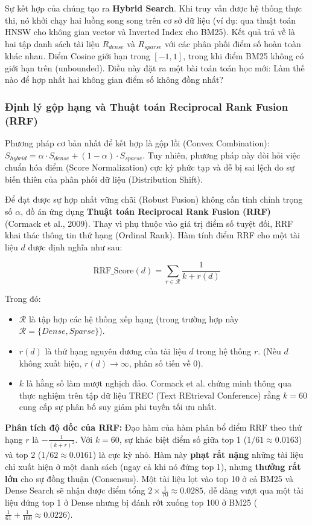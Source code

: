 Sự kết hợp của chúng tạo ra \textbf{Hybrid Search}. Khi truy vấn được hệ thống thực thi, nó khởi chạy hai luồng song song trên cơ sở dữ liệu (ví dụ: qua thuật toán HNSW cho không gian vector và Inverted Index cho BM25). Kết quả trả về là hai tập danh sách tài liệu $R_{dense}$ và $R_{sparse}$ với các phân phối điểm số hoàn toàn khác nhau. Điểm Cosine giới hạn trong $[-1, 1]$, trong khi điểm BM25 không có giới hạn trên (unbounded). Điều này đặt ra một bài toán toán học mới: Làm thế nào để hợp nhất hai không gian điểm số không đồng nhất?

\subsubsection{Định lý gộp hạng và Thuật toán Reciprocal Rank Fusion (RRF)}
Phương pháp cơ bản nhất để kết hợp là gộp lồi (Convex Combination): $S_{hybrid} = \alpha \cdot S_{dense} + (1 - \alpha) \cdot S_{sparse}$. Tuy nhiên, phương pháp này đòi hỏi việc chuẩn hóa điểm (Score Normalization) cực kỳ phức tạp và dễ bị sai lệch do sự biến thiên của phân phối dữ liệu (Distribution Shift).

Để đạt được sự hợp nhất vững chãi (Robust Fusion) không cần tinh chỉnh trọng số $\alpha$, đồ án ứng dụng \textbf{Thuật toán Reciprocal Rank Fusion (RRF)} (Cormack et al., 2009). Thay vì phụ thuộc vào giá trị điểm số tuyệt đối, RRF khai thác thông tin thứ hạng (Ordinal Rank). Hàm tính điểm RRF cho một tài liệu $d$ được định nghĩa như sau:

\begin{equation}
    \text{RRF\_Score}(d) = \sum_{r \in \mathcal{R}} \frac{1}{k + r(d)}
\end{equation}

Trong đó:
\begin{itemize}
    \item $\mathcal{R}$ là tập hợp các hệ thống xếp hạng (trong trường hợp này $\mathcal{R} = \{Dense, Sparse\}$).
    \item $r(d)$ là thứ hạng nguyên dương của tài liệu $d$ trong hệ thống $r$. (Nếu $d$ không xuất hiện, $r(d) \rightarrow \infty$, phân số tiến về 0).
    \item $k$ là hằng số làm mượt nghịch đảo. Cormack et al. chứng minh thông qua thực nghiệm trên tập dữ liệu TREC (Text REtrieval Conference) rằng $k=60$ cung cấp sự phân bố suy giảm phi tuyến tối ưu nhất.
\end{itemize}

\textbf{Phân tích độ dốc của RRF:} 
Đạo hàm của hàm phân bổ điểm RRF theo thứ hạng $r$ là $-\frac{1}{(k+r)^2}$. Với $k=60$, sự khác biệt điểm số giữa top 1 ($1/61 \approx 0.0163$) và top 2 ($1/62 \approx 0.0161$) là cực kỳ nhỏ. Hàm này \textbf{phạt rất nặng} những tài liệu chỉ xuất hiện ở một danh sách (ngay cả khi nó đứng top 1), nhưng \textbf{thưởng rất lớn} cho sự đồng thuận (Consensus). Một tài liệu lọt vào top 10 ở cả BM25 và Dense Search sẽ nhận được điểm tổng $2 \times \frac{1}{70} \approx 0.0285$, dễ dàng vượt qua một tài liệu đứng top 1 ở Dense nhưng bị đánh rớt xuống top 100 ở BM25 ($ \frac{1}{61} + \frac{1}{160} \approx 0.0226$). 

